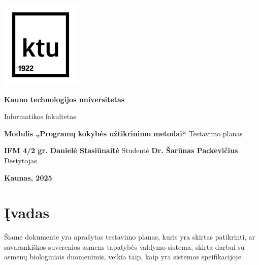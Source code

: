 \documentclass[12pt]{article}
\begin{document}

\begin{titlepage}
\vskip 20pt
\begin{center}
\includegraphics[scale=1.4]{KTU.png}
\end{center}


\vskip 20pt
\centerline{\bf \large \textbf{Kauno technologijos universitetas}}
\bigskip
\centerline{\large {Informatikos fakultetas}}
\bigskip

\vskip 90pt
\begin{center}
    {\bf \LARGE Modulis „Programų kokybės užtikrinimo metodai“}
    \vskip 15pt
    {\large Testavimo planas}
\end{center}

\vskip 40pt

\hskip 200pt {\bf \large IFM 4/2 gr. Danielė Stasiūnaitė}
\vskip 1pt
\hskip 200pt {\large Studentė}
\vskip 7pt
\hskip 200pt {\bf \large Dr. Šarūnas Packevičius}
\vskip 1pt
\hskip 200pt {\large Dėstytojas}

\bigskip

\vskip 100pt
\centerline{\large \textbf{Kaunas, 2025}}
\newpage
\end{titlepage}



\tableofcontents
\newpage


\section{Įvadas}
Šiame dokumente yra aprašytas testavimo planas, kuris yra skirtas patikrinti, ar
savarankiškos suverenios asmens tapatybės valdymo sistema, skirta darbui su
asmenų biologiniais duomenimis, veikia taip, kaip yra sistemos speifikacijoje.
\end{document}
